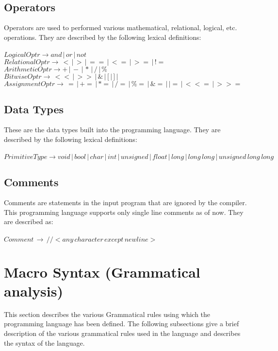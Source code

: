 \documentclass[12pt, a4paper]{article}
\begin{document}
	 	\subsection{Operators}
	 		Operators are used to performed various mathematical, relational, logical, etc. operations. They are described by the following lexical definitions: \\ \\
	 		$ LogicalOptr \to and \,|\, or \,|\, not $ \\
	 		$ RelationalOptr \to \, < \,|\, > \,|\, == \,|\, <= \,|\, >= \,|\, != $ \\
	 		$ ArithmeticOptr \to + \,|\, - \,|\, * \,|\, / \,|\, \% $ \\
	 		$ BitwiseOptr \to \, << \,|\, >> \,|\, \& \,|\, [ \,|\, ] \,|\, ~ $ \\
	 		$ AssignmentOptr \to \, = \,|\, += \,|\, *= \,|\,  /= \,|\, \%= \,|\, \&= \,|\, |= \,|\, <<= \,|\, >>= $ \\
	 		
	 	\subsection{Data Types}
	 		These are the data types built into the programming language. They are described by the following lexical definitions: \\ \\
	 		$ PrimitiveType \to void \,|\, bool  \,| \, char  \,| \, int  \,| \, unsigned \,|\, float  \,|\, long \,|\, long \, long  \,|\, unsigned \, long \, long$ \\
	 		
	 	\subsection{Comments}
	 		Comments are statements in the input program that are ignored by the compiler. This programming language supports only single line comments as of now. They are described as: \\ \\
	 		$ Comment \,\to\, {//}<any \, character \, except \, newline> $  \\
	 		
	\section[Macro Syntax]{Macro Syntax (Grammatical analysis)}
		This section describes the various Grammatical rules using which the programming language has been defined. The following subsections give a brief description of the various grammatical rules used in the language and describes the syntax of the language.
		
\end{document}
